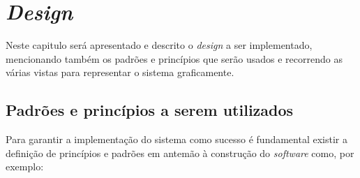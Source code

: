 \chapter{\textit{Design}}
\label{Chapter5}
Neste capitulo será apresentado e descrito o \textit{design} a ser implementado, mencionando também os padrões e princípios que serão usados e recorrendo as várias vistas para representar o sistema graficamente.

\section{Padrões e princípios a serem utilizados}
Para garantir a implementação do sistema como sucesso é fundamental existir a definição de princípios e padrões em antemão à construção do \textit{software} como, por exemplo:
